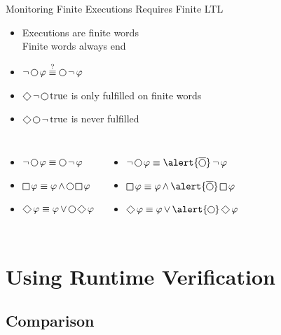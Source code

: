 \begin{frame}{Monitoring Finite Executions Requires Finite LTL}
  \begin{itemize}
    \item Executions are \alert{finite} words\\
      Finite words always end
    \item $\LTLnot\LTLnext\phi \overset?\equiv \LTLnext\LTLnot\phi$
    \pause
    \item $\LTLfinally \LTLnot \LTLnext \LTLtrue$ is only fulfilled on finite words
    \item $\LTLfinally \LTLnext \LTLnot \LTLtrue$ is never fulfilled
  \end{itemize}

  \xxx\xxx\pause

  \begin{center}
    \begin{columns}
      \column{3.8cm}
      \begin{itemize}
        \item $\LTLnot\LTLnext\phi \equiv \LTLnext\LTLnot\phi$
        \item $\LTLglobally \phi \equiv \phi \LTLand \LTLnext\LTLglobally\phi$
        \item $\LTLfinally \phi \equiv \phi \LTLor \LTLnext\LTLfinally\phi$
      \end{itemize}
      \column{3.8cm}\pause
      \begin{itemize}
        \item $\LTLnot\LTLnext\phi \equiv \alert{\LTLweaknext}\LTLnot\phi$
        \item $\LTLglobally \phi \equiv \phi \LTLand \alert{\LTLweaknext}\LTLglobally\phi$
        \item $\LTLfinally \phi \equiv \phi \LTLor \alert{\LTLnext}\LTLfinally\phi$
      \end{itemize}
    \end{columns}
  \end{center}
\end{frame}

\section{Using Runtime Verification}

\subsection{Comparison}

